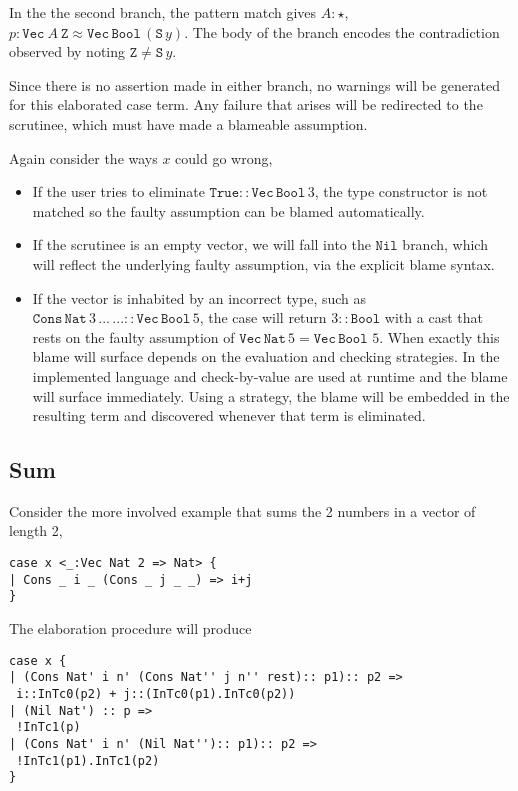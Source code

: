 In the the second branch, the pattern match gives $A:\star$, $p:\mathtt{Vec}\ A\ \mathtt{Z}\approx\mathtt{Vec}\,\mathtt{Bool}\,(\mathtt{S}\,y)$.
The body of the branch encodes the contradiction observed by noting $\mathtt{Z}\neq\mathtt{S}\,y$.
 
Since there is no assertion made in either branch, no warnings will be generated for this elaborated case term.
Any failure that arises will be redirected to the scrutinee, which must have made a blameable assumption.
 
Again consider the ways $x$ could go wrong,
\begin{itemize}
\item
If the user tries to eliminate $\mathtt{True}::\mathtt{Vec}\,\mathtt{Bool}\,3$, the type constructor is not matched so the faulty assumption can be blamed automatically.
\item
If the scrutinee is an empty vector, we will fall into the $\mathtt{Nil}$ branch, which will reflect the underlying faulty assumption, via the explicit blame syntax.
\item
If the vector is inhabited by an incorrect type, such as $\mathtt{Cons}\,\mathtt{Nat}\,3\,...\,...::\mathtt{Vec}\,\mathtt{Bool}\,5$, the case will return $3::\mathtt{Bool}$ with a cast that rests on the faulty assumption of $\mathtt{Vec}\,\mathtt{Nat}\,5=\mathtt{Vec}\,\mathtt{Bool}\,\,5$.
When exactly this blame will surface depends on the evaluation and checking strategies.
In the implemented language \cbv{} and check-by-value are used at runtime and the blame will surface immediately.
Using a \whnf{} strategy, the blame will be embedded in the resulting term and discovered whenever that term is eliminated.
\end{itemize}
 
\subsection{Sum}
 
Consider the more involved example that sums the 2 numbers in a vector of length 2,
 
\begin{lstlisting}[basicstyle={\ttfamily\small}]
case x <_:Vec Nat 2 => Nat> {
| Cons _ i _ (Cons _ j _ _) => i+j
}
\end{lstlisting}
 
The elaboration procedure will produce
 
\begin{lstlisting}[basicstyle={\ttfamily\small}]
case x {
| (Cons Nat' i n' (Cons Nat'' j n'' rest):: p1):: p2 =>
 i::InTc0(p2) + j::(InTc0(p1).InTc0(p2))
| (Nil Nat') :: p =>
 !InTc1(p)
| (Cons Nat' i n' (Nil Nat''):: p1):: p2 =>
 !InTc1(p1).InTc1(p2)
}
\end{lstlisting}
 
